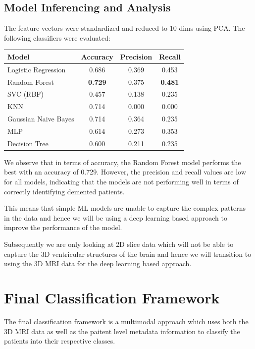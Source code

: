 \documentclass[10pt,twocolumn]{article}
\begin{document}
        \subsection{Model Inferencing and Analysis}
        The feature vectors were standardized and reduced to 10 dims using PCA. The following classifiers were evaluated:

        \noindent
        \begin{tabular}{lccc}
            \toprule
            \textbf{Model} & \textbf{Accuracy} & \textbf{Precision} & \textbf{Recall}\\
            \midrule
            Logistic Regression & 0.686 & 0.369 & 0.453\\
            Random Forest & \textbf{0.729} & 0.375 & \textbf{0.481}\\
            SVC (RBF) & 0.457 & 0.138 & 0.235\\
            KNN & 0.714 & 0.000 & 0.000\\
            Gaussian Naive Bayes & 0.714 & 0.364 & 0.235\\
            MLP & 0.614 & 0.273 & 0.353\\
            Decision Tree & 0.600 & 0.211 & 0.235\\
            \bottomrule
        \end{tabular}

        \noindent
        We observe that in terms of accuracy, the Random Forest model performs the best with an accuracy of 0.729. However, the precision and recall values are low for all models, indicating that the models are not performing well in terms of correctly identifying demented patients.

        \noindent
        This means that simple ML models are unable to capture the complex patterns in the data and hence we will be using a deep learning based approach to improve the performance of the model.

        \noindent
        Subsequently we are only looking at 2D slice data which will not be able to capture the 3D ventricular structures of the brain and hence we will transition to using the 3D MRI data for the deep learning based approach.


\section{Final Classification Framework}
    The final classification framework is a multimodal approach which uses both the 3D MRI data as well as the paitent level metadata information to classify the patients into their respective classes.
    
\end{document}
